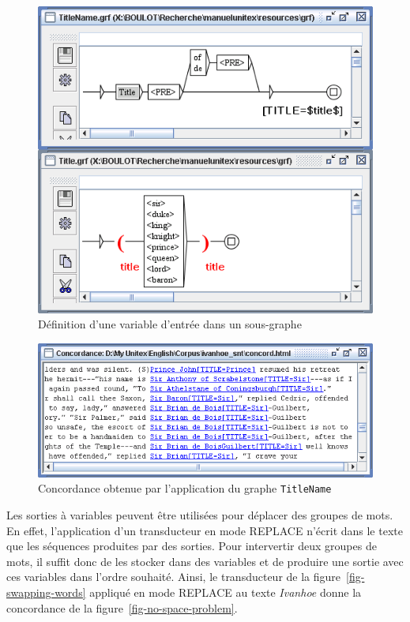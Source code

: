 \begin{figure}[!p]
\begin{center}
\includegraphics[width=12cm]{resources/img/fig6-25.png}
\caption{Définition d’une variable d'entrée dans un sous-graphe\label{fig-variable-definition}}
\end{center}
\end{figure}

\begin{figure}[!p]
\begin{center}
\includegraphics[width=13.5cm]{resources/img/fig6-26.png}
\caption{Concordance obtenue par l’application du graphe \texttt{TitleName}\label{fig6-14}}
\end{center}
\end{figure}

\bigskip
\noindent Les sorties à variables peuvent être utilisées pour déplacer des groupes de mots. En effet,
l’application d’un transducteur en mode REPLACE n’écrit dans le texte que les séquences
produites par des sorties. Pour intervertir deux groupes de mots, il suffit donc de les stocker
dans des variables et de produire une sortie avec ces variables dans l’ordre souhaité. Ainsi,
le transducteur de la
figure~\ref{fig-swapping-words} appliqué en mode REPLACE au texte \textit{Ivanhoe}
donne la concordance de la figure~\ref{fig-no-space-problem}.

